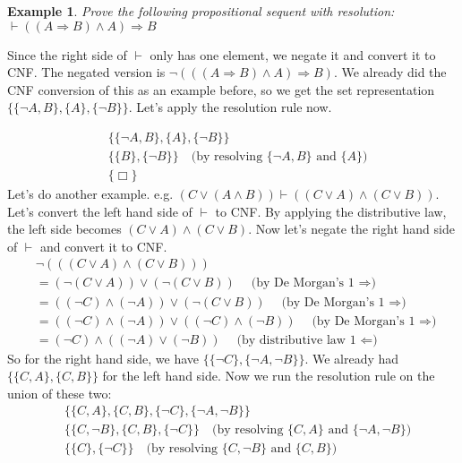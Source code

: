 \documentclass[10pt]{article}
\newtheorem{problem}{Example}
\newenvironment{solution}[1][\emph{Solution:}]{\begin{trivlist}
\item[\hskip \labelsep {\bfseries #1}]}{\end{trivlist}}
\newcommand{\imp}{\ensuremath{\Rightarrow}}
\newcommand{\set}[1]{\{#1\}}
\begin{document}
\begin{problem} Prove the following propositional sequent with resolution: $\vdash ((A \imp B) \land A) \imp B$
\end{problem}
\begin{solution}
Since the right side of $\vdash$ only has one element, we negate it and convert it to CNF. The negated version is $\lnot(((A \imp B) \land A) \imp B)$. We already did the CNF conversion of this as an example before, so we get the set representation $\set{\set{\lnot A, B}, \set{A}, \set{\lnot B}}$. Let's apply the resolution rule now.

\begin{align*}
& \set{\set{\lnot A, B}, \set{A}, \set{\lnot B}}\\
& \set{\set{B}, \set{\lnot B}} \quad\text{(by resolving $\set{\lnot A,B}$ and $\set{A}$)}\\
& \set{\Box}
\end{align*}
Let's do another example. e.g. $(C \lor (A \land B)) \vdash ((C \lor A) \land (C \lor B))$. Let's convert the left hand side of $\vdash$ to CNF. By applying the distributive law, the left side becomes $(C \lor A) \land (C \lor B)$. Now let's negate the right hand side of $\vdash$ and convert it to CNF.
\begin{align*}
& \lnot (((C \lor A) \land (C \lor B)))\\
&= (\lnot(C \lor A)) \lor (\lnot (C \lor B)) \quad\text{(by De Morgan's 1 $\imp$)}\\
&= ((\lnot C) \land (\lnot A)) \lor (\lnot (C \lor B)) \quad\text{(by De Morgan's 1 $\imp$)}\\
&= ((\lnot C) \land (\lnot A)) \lor ((\lnot C) \land (\lnot B)) \quad\text{(by De Morgan's 1 $\imp$)}\\
&= (\lnot C) \land ((\lnot A) \lor (\lnot B)) \quad\text{(by distributive law 1 $\Leftarrow$)}
\end{align*}
So for the right hand side, we have $\set{\set{\lnot C}, \set{\lnot A, \lnot B}}$. We already had $\set{\set{C,A}, \set{C,B}}$ for the left hand side. Now we run the resolution rule on the union of these two:
\begin{align*}
& \set{\set{C,A}, \set{C,B}, \set{\lnot C}, \set{\lnot A, \lnot B}}\\
& \set{\set{C,\lnot B}, \set{C,B}, \set{\lnot C}}  \quad\text{(by resolving $\set{C,A}$ and $\set{\lnot A, \lnot B}$)}\\
& \set{\set{C}, \set{\lnot C}} \quad\text{(by resolving $\set{C,\lnot B}$ and $\set{C, B}$)}\\

\end{align*}
\end{solution}
\end{document}
